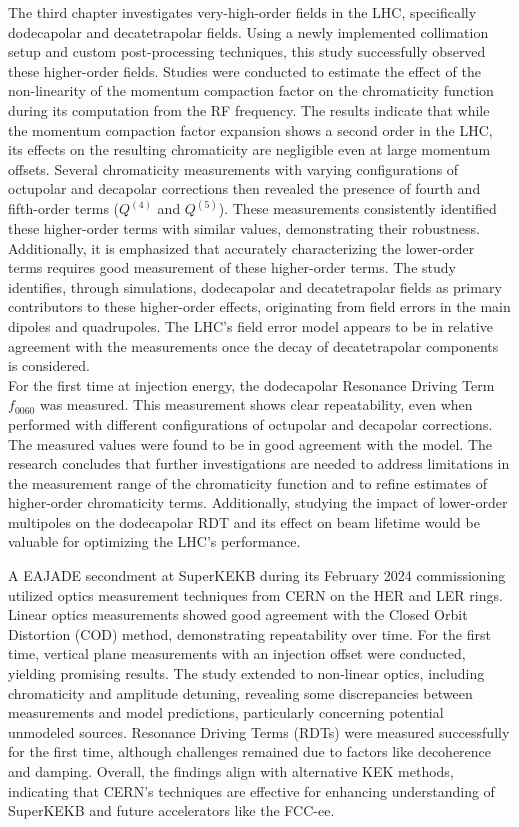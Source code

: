 {%
The third chapter investigates very-high-order fields in the LHC, specifically dodecapolar and
decatetrapolar fields. Using a newly implemented collimation setup and custom post-processing
techniques, this study successfully observed these higher-order fields. Studies were conducted to
estimate the effect of the non-linearity of the momentum compaction factor on the chromaticity
function during its computation from the RF frequency. The results indicate that while the momentum
compaction factor expansion shows a second order in the LHC, its effects on the resulting
chromaticity are negligible even at large momentum offsets. Several chromaticity measurements with
varying configurations of octupolar and decapolar corrections then revealed the presence of fourth
and fifth-order terms ($Q^{(4)}$ and $Q^{(5)}$). These measurements consistently identified these
higher-order terms with similar values, demonstrating their robustness. Additionally, it is
emphasized that accurately characterizing the lower-order terms requires good measurement of these
higher-order terms. The study identifies, through simulations, dodecapolar and decatetrapolar fields
as primary contributors to these higher-order effects, originating from field errors in the main
dipoles and quadrupoles. The LHC's field error model appears to be in relative agreement with the
measurements once the decay of decatetrapolar components is considered.
\\
\indent
For the first time at injection energy, the dodecapolar Resonance Driving Term $f_{0060}$ was
measured. This measurement shows clear repeatability, even when performed with different
configurations of octupolar and decapolar corrections. The measured values were found to be in good
agreement with the model. The research concludes that further investigations are needed to address
limitations in the measurement range of the chromaticity function and to refine estimates of
higher-order chromaticity terms. Additionally, studying the impact of lower-order multipoles on the
dodecapolar RDT and its effect on beam lifetime would be valuable for optimizing the LHC's
performance.

A EAJADE secondment at SuperKEKB during its February 2024 commissioning utilized optics
measurement techniques from CERN on the HER and LER rings. Linear optics measurements showed good
agreement with the Closed Orbit Distortion (COD) method, demonstrating repeatability over time. For
the first time, vertical plane measurements with an injection offset were conducted, yielding
promising results. The study extended to non-linear optics, including chromaticity and amplitude
detuning, revealing some discrepancies between measurements and model predictions, particularly
concerning potential unmodeled sources. Resonance Driving Terms (RDTs) were measured successfully
for the first time, although challenges remained due to factors like decoherence and damping.
Overall, the findings align with alternative KEK methods, indicating that CERN's techniques are
effective for enhancing understanding of SuperKEKB and future accelerators like the FCC-ee.


}
